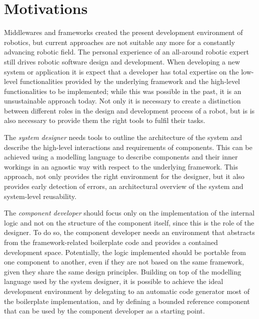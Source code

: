 \section{Motivations}
Middlewares and frameworks created the present development environment of robotics, but current approaches are not suitable any more for a constantly advancing robotic field. The personal experience of an all-around robotic expert still drives robotic software design and development. When developing a new system or application it is expect that a developer has total expertise on the low-level functionalities provided by the underlying framework and the high-level functionalities to be implemented; while this was possible in the past, it is an unsustainable approach today. Not only it is necessary to create a distinction between different roles in the design and development process of a robot, but is is also necessary to provide them the right tools to fulfil  their tasks.

The \textit{system designer} needs tools to outline the architecture of the system and describe the high-level interactions and requirements of components. This can be achieved using a modelling language to describe components and their inner workings in an agnostic way with respect to the underlying framework. This approach, not only provides the right environment for the designer, but it also provides early detection of errors, an architectural overview of the system and system-level reusability. 

The \textit{component developer} should focus only on the implementation of the internal logic and not on the structure of the component itself, since this is the role of the designer. To do so, the component developer needs an environment that abstracts from the framework-related boilerplate code and provides a contained development space. Potentially, the logic implemented should be portable from one component to another, even if they are not based on the same framework, given they share the same design principles. Building on top of the modelling language used by the system designer, it is possible to achieve the ideal development environment by delegating to an automatic code generator most of the boilerplate implementation, and by defining a bounded reference component that can be used by the component developer as a starting point.

